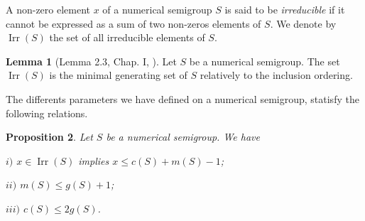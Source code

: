 \documentclass[reqno,11pt]{amsart}
\theoremstyle{plain}
\newtheorem{prop}{Proposition}[section]
\theoremstyle{definition}
\newtheorem{lem}[prop]{Lemma}
\renewcommand{\leq}{\leqslant}
\DeclareMathOperator{\Irr}{Irr}
\DeclareMathOperator{\App}{App}
\begin{document}
A non-zero element $x$ of a numerical semigroup $S$ is said to be \emph{irreducible} if it cannot be expressed as a sum of two non-zeros elements of $S$.  
We denote by $\Irr(S)$ the set of all irreducible elements of $S$.

\begin{lem}[Lemma 2.3, Chap. I, \cite{BookNS}]
Let $S$ be a numerical semigroup. The set $\Irr(S)$ is the minimal generating set of $S$ relatively to the inclusion ordering.
\end{lem} 


%


%
%
%

The differents parameters we have defined on a numerical semigroup, statisfy the following relations.

\begin{prop}
\label{P:Res}
Let $S$ be a numerical semigroup. We have

$i)$  $x\in \Irr(S)$ implies $x\leq c(S)+m(S)-1$;

$ii)$ $m(S)\leq g(S)+1$;

$iii)$ $c(S)\leq 2 g(S)$.
\end{prop}
\end{document}
